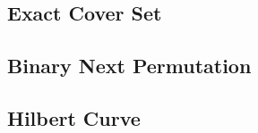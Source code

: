 \documentclass[a4paper,10pt,twocolumn,oneside]{article}
\begin{document}
\subsection{Exact Cover Set}


%

\subsection{Binary Next Permutation}


\subsection{Hilbert Curve}


%
\end{document}
